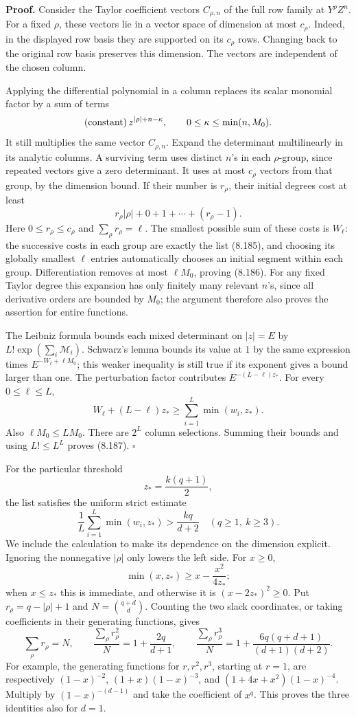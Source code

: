 \documentclass[
  11pt,
  a4paper,
]{article}
\begin{document}
\textbf{Proof.} Consider the Taylor coefficient vectors \(C_{\rho,n}\)
of the full row family at \(Y^\rho Z^n\). For a fixed \(\rho\), these
vectors lie in a vector space of dimension at most \(c_\rho\). Indeed,
in the displayed row basis they are supported on its \(c_\rho\) rows.
Changing back to the original row basis preserves this dimension. The
vectors are independent of the chosen column.

Applying the differential polynomial in a column replaces its scalar
monomial factor by a sum of terms \[
(\hbox{constant})\,z^{|\rho|+n-\kappa},
\qquad 0\le\kappa\le\min(n,M_0).
\] It still multiplies the same vector \(C_{\rho,n}\). Expand the
determinant multilinearly in its analytic columns. A surviving term uses
distinct \(n\)'s in each \(\rho\)-group, since repeated vectors give a
zero determinant. It uses at most \(c_\rho\) vectors from that group, by
the dimension bound. If their number is \(r_\rho\), their initial
degrees cost at least \[
r_\rho|\rho|+0+1+\cdots+(r_\rho-1).
\] Here \(0\le r_\rho\le c_\rho\) and \(\sum_\rho r_\rho=\ell\). The
smallest possible sum of these costs is \(W_\ell\): the successive costs
in each group are exactly the list (8.185), and choosing its globally
smallest \(\ell\) entries automatically chooses an initial segment
within each group. Differentiation removes at most \(\ell M_0\), proving
(8.186). For any fixed Taylor degree this expansion has only finitely
many relevant \(n\)'s, since all derivative orders are bounded by
\(M_0\); the argument therefore also proves the assertion for entire
functions.

The Leibniz formula bounds each mixed determinant on \(|z|=E\) by
\(L!\exp(\sum_i\mathcal M_i)\). Schwarz's lemma bounds its value at
\(1\) by the same expression times \(E^{-W_\ell+\ell M_0}\); this weaker
inequality is still true if its exponent gives a bound larger than one.
The perturbation factor contributes \(E^{-(L-\ell)z_*}\). For every
\(0\le\ell\le L\), \[
W_\ell+(L-\ell)z_*
\ge\sum_{i=1}^L\min(w_i,z_*).
\] Also \(\ell M_0\le LM_0\). There are \(2^L\) column selections.
Summing their bounds and using \(L!\le L^L\) proves (8.187). \(\square\)

For the particular threshold \[
z_*=\frac{k(q+1)}2,
\] the list satisfies the uniform strict estimate \[
\frac1L\sum_{i=1}^L\min(w_i,z_*)>\frac{kq}{d+2}
\quad(q\ge1,\ k\ge3).
\tag{8.188}
\] We include the calculation to make its dependence on the dimension
explicit. Ignoring the nonnegative \(|\rho|\) only lowers the left side.
For \(x\ge0\), \[
\min(x,z_*)\ge x-\frac{x^2}{4z_*};
\] when \(x\le z_*\) this is immediate, and otherwise it is
\((x-2z_*)^2\ge0\). Put \(r_\rho=q-|\rho|+1\) and \(N=\binom{q+d}{d}\).
Counting the two slack coordinates, or taking coefficients in their
generating functions, gives \[
\sum_\rho r_\rho=N,\qquad
\frac{\sum_\rho r_\rho^2}{N}=1+\frac{2q}{d+1},\qquad
\frac{\sum_\rho r_\rho^3}{N}
=1+\frac{6q(q+d+1)}{(d+1)(d+2)}.
\] For example, the generating functions for \(r,r^2,r^3\), starting at
\(r=1\), are respectively \((1-x)^{-2}\), \((1+x)(1-x)^{-3}\), and
\((1+4x+x^2)(1-x)^{-4}\). Multiply by \((1-x)^{-(d-1)}\) and take the
coefficient of \(x^q\). This proves the three identities also for
\(d=1\).
\end{document}
